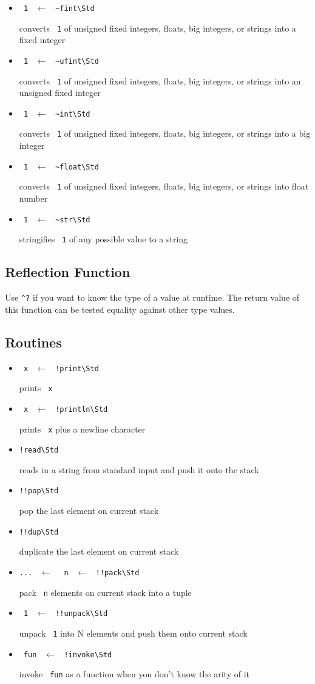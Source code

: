 \documentclass{report}
\newcommand{\mstd}[1]{\texttt{#1\textbackslash Std}}
\newcommand{\mtilde}[1]{\textasciitilde}
\newcommand{\marg}[1]{\texttt{\mtilde ~#1}}
\newcommand{\mla}[0]{~$\leftarrow$ ~}
\begin{document}
\begin{itemize}
\item \marg1 \mla \mstd{\textasciitilde fint}

converts \marg1 of unsigned fixed integers, floats, big integers, or strings into a fixed integer
\item \marg1 \mla \mstd{\textasciitilde ufint}

converts \marg1 of unsigned fixed integers, floats, big integers, or strings into an unsigned fixed integer
\item \marg1 \mla \mstd{\textasciitilde int}

converts \marg1 of unsigned fixed integers, floats, big integers, or strings into a big integer
\item \marg1 \mla \mstd{\textasciitilde float}

converts \marg1 of unsigned fixed integers, floats, big integers, or strings into float number
\item \marg1 \mla \mstd{\textasciitilde str}

stringifies \marg1 of any possible value to a string
\end{itemize}

\subsection{Reflection Function}

Use \texttt{\string^?} if you want to know the type of a value at runtime. The return value of this function can be tested equality against other type values.

\subsection{Routines}

\begin{itemize}
\item \marg{x} \mla \mstd{!print}

prints \marg{x}
\item \marg{x} \mla \mstd{!println}

prints \marg{x} plus a newline character
\item \mstd{!read}

reads in a string from standard input and push it onto the stack
\item \mstd{!!pop}

pop the last element on current stack
\item \mstd{!!dup}

duplicate the last element on current stack
\item \texttt{...} \mla \marg{n} \mla \mstd{!!pack}

pack \marg{n} elements on current stack into a tuple
\item \marg1 \mla \mstd{!!unpack}

unpack \marg1 into N elements and push them onto current stack
\item \marg{fun} \mla \mstd{!invoke}

invoke \marg{fun} as a function when you don't know the arity of it
\end{itemize}
\end{document}
